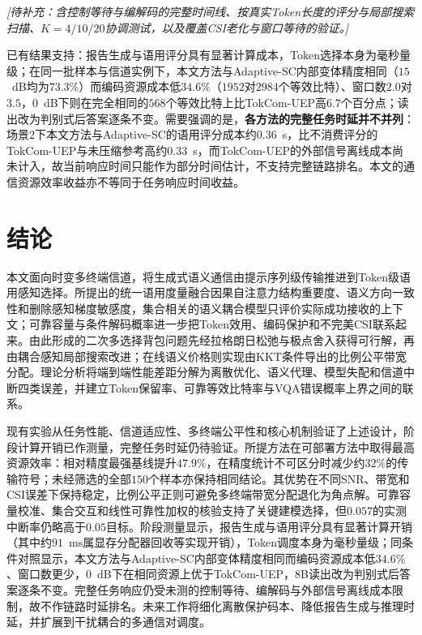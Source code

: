 \documentclass[journal]{IEEEtran}
\begin{document}
\noindent\textit{[待补充：含控制等待与编解码的完整时间线、按真实Token长度的评分与局部搜索扫描、$K=4/10/20$协调测试，以及覆盖CSI老化与窗口等待的验证。]}

已有结果支持：报告生成与语用评分具有显著计算成本，Token选择本身为毫秒量级；在同一批样本与信道实例下，本文方法与Adaptive-SC内部变体精度相同（$15$~dB均为$73.3\%$）而编码资源成本低$34.6\%$（$1952$对$2984$个等效比特）、窗口数$2.0$对$3.5$，$0$~dB下则在完全相同的$568$个等效比特上比TokCom-UEP高$6.7$个百分点；读出改为判别式后答案逐条不变。需要强调的是，\textbf{各方法的完整任务时延并不并列}：场景2下本文方法与Adaptive-SC的语用评分成本约$0.36$~s，比不消费评分的TokCom-UEP与未压缩参考高约$0.33$~s，而TokCom-UEP的外部信号离线成本尚未计入，故当前响应时间只能作为部分时间估计，不支持完整链路排名。本文的通信资源效率收益亦不等同于任务响应时间收益。

\balance
\section{结论}
\label{sec:conclusion}

本文面向时变多终端信道，将生成式语义通信由提示序列级传输推进到Token级语用感知选择。所提出的统一语用度量融合因果自注意力结构重要度、语义方向一致性和删除感知梯度敏感度，集合相关的语义耦合模型只评价实际成功接收的上下文；可靠容量与条件解码概率进一步把Token效用、编码保护和不完美CSI联系起来。由此形成的二次多选择背包问题先经拉格朗日松弛与极点舍入获得可行解，再由耦合感知局部搜索改进；在线语义价格则实现由KKT条件导出的比例公平带宽分配。理论分析将端到端性能差距分解为离散优化、语义代理、模型失配和信道中断四类误差，并建立Token保留率、可靠等效比特率与VQA错误概率上界之间的联系。

现有实验从任务性能、信道适应性、多终端公平性和核心机制验证了上述设计，阶段计算开销已作测量，完整任务时延仍待验证。所提方法在可部署方法中取得最高资源效率：相对精度最强基线提升$47.9\%$，在精度统计不可区分时减少约$32\%$的传输符号；未经筛选的全部$150$个样本亦保持相同结论。其优势在不同SNR、带宽和CSI误差下保持稳定，比例公平正则可避免多终端带宽分配退化为角点解。可靠容量校准、集合交互和线性可靠性加权的核验支持了关键建模选择，但$0.057$的实测中断率仍略高于$0.05$目标。阶段测量显示，报告生成与语用评分具有显著计算开销（其中约$91$~ms属显存分配器回收等实现开销），Token调度本身为毫秒量级；同条件对照显示，本文方法与Adaptive-SC内部变体精度相同而编码资源成本低$34.6\%$、窗口数更少，$0$~dB下在相同资源上优于TokCom-UEP，8B读出改为判别式后答案逐条不变。完整任务响应仍受未测的控制等待、编解码与外部信号离线成本限制，故不作链路时延排名。未来工作将细化离散保护码本、降低报告生成与推理时延，并扩展到干扰耦合的多通信对调度。



\end{document}
